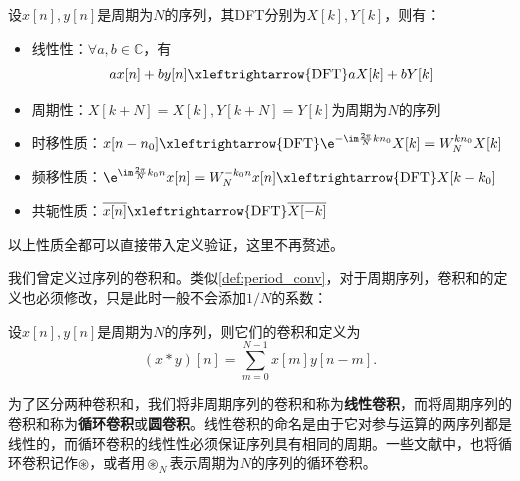 \begin{proposition}[离散傅里叶变换的运算性质]
    \label{prop:DFT_operation}
    设$x[n],y[n]$是周期为$N$的序列，其DFT分别为$X[k],Y[k]$，则有：
    \begin{itemize}
        \item 线性性：$\forall a,b\in\mathbb{C}$，有
        \begin{equation}
            a x[n]+b y[n]\xleftrightarrow{\mathrm{DFT}} a X[k]+b Y[k]
        \end{equation}
        \item 周期性：$X[k+N]=X[k],Y[k+N]=Y[k]$为周期为$N$的序列
        \item 时移性质：$x[n-n_0]\xleftrightarrow{\mathrm{DFT}}\e^{-\im\frac{2\pi}{N}kn_0}X[k]=W_N^{kn_0}X[k]$
        \item 频移性质：$\e^{\im\frac{2\pi}{N}k_0 n}x[n]=W_N^{-k_0 n}x[n]\xleftrightarrow{\mathrm{DFT}}X[k-k_0]$
        \item 共轭性质：$\overline{x[n]}\xleftrightarrow{\mathrm{DFT}}\overline{X[-k]}$
    \end{itemize}
\end{proposition}

以上性质全都可以直接带入定义验证，这里不再赘述。

我们曾定义过序列的卷积和。类似\cref{def:period_conv}，对于周期序列，卷积和的定义也必须修改，只是此时一般不会添加$1/N$的系数：
\begin{definition}[周期序列的卷积和]
    设$x[n],y[n]$是周期为$N$的序列，则它们的卷积和定义为
    \begin{equation}
        (x*y)[n]=\sum_{m=0}^{N-1}x[m]y[n-m].
    \end{equation}
\end{definition}
为了区分两种卷积和，我们将非周期序列的卷积和称为\textbf{线性卷积}，而将周期序列的卷积和称为\textbf{循环卷积}或\textbf{圆卷积}。线性卷积的命名是由于它对参与运算的两序列都是线性的，而循环卷积的线性性必须保证序列具有相同的周期。一些文献中，也将循环卷积记作$\circledast$，或者用$\circledast_N$表示周期为$N$的序列的循环卷积。

